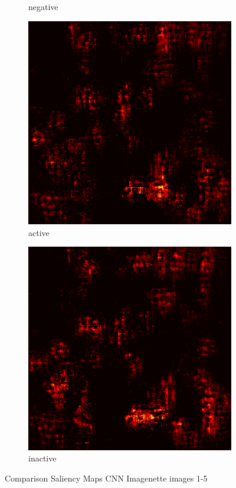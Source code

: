 \documentclass[preprint,12pt]{elsarticle}
\begin{document}
\begin{figure}
\begin{subfigure}{0.14\textwidth}
        \caption{negative}
    \end{subfigure}
    \hfill
    \begin{subfigure}{0.14\textwidth}
        \centering
        \includegraphics[width=\linewidth]{../visualizations/examples/imagenette/cnn/active_saliency_map/4.png}
        \caption{active}
    \end{subfigure}
    \hfill
    \begin{subfigure}{0.14\textwidth}
        \centering
        \includegraphics[width=\linewidth]{../visualizations/examples/imagenette/cnn/inactive_saliency_map/4.png}
        \caption{inactive}
    \end{subfigure}
    \hfill
    \caption{Comparison Saliency Maps CNN Imagenette images 1-5}
\end{figure}
\end{document}
